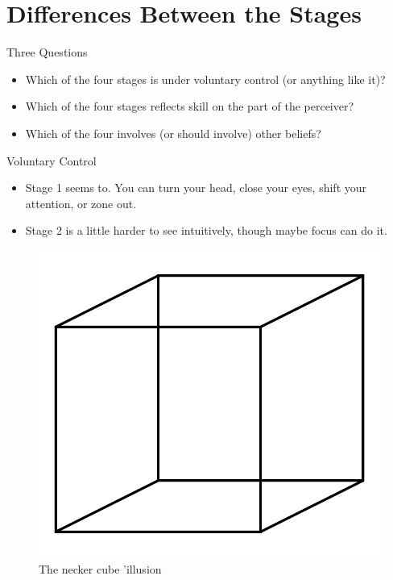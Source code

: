 \documentclass[
  17pt,
  letterpaper,
  ignorenonframetext,
  aspectratio=169,
]{beamer}
\providecommand{\tightlist}{%
  \setlength{\itemsep}{0pt}\setlength{\parskip}{0pt}}\usepackage{longtable,booktabs,array}
\begin{document}
\hypertarget{differences-between-the-stages}{%
\section{Differences Between the
Stages}\label{differences-between-the-stages}}

\begin{frame}{Three Questions}
\protect\hypertarget{three-questions}{}
\begin{itemize}[<+->]
\tightlist
\item
  Which of the four stages is under voluntary control (or anything like
  it)?
\item
  Which of the four stages reflects skill on the part of the perceiver?
\item
  Which of the four involves (or should involve) other beliefs?
\end{itemize}
\end{frame}

\begin{frame}{Voluntary Control}
\protect\hypertarget{voluntary-control}{}
\begin{itemize}[<+->]
\tightlist
\item
  Stage 1 seems to. You can turn your head, close your eyes, shift your
  attention, or zone out.
\item
  Stage 2 is a little harder to see intuitively, though maybe focus can
  do it.
\end{itemize}
\end{frame}

\begin{frame}
\begin{figure}

{\centering \includegraphics[width=\textwidth,height=0.6\textheight]{../images/necker.png}

}

\caption{The necker cube 'illusion}

\end{figure}
\end{frame}
\end{document}
